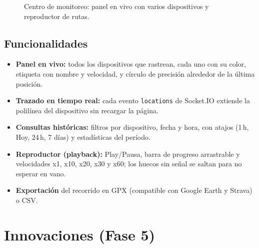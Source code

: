 \documentclass[11pt]{article}
\begin{document}
\begin{figure}[H]
{}
\caption{Centro de monitoreo: panel en vivo con varios dispositivos y reproductor de rutas.}
\end{figure}

\subsection{Funcionalidades}
\begin{itemize}
  \item \textbf{Panel en vivo:} todos los dispositivos que rastrean, cada uno con su color, etiqueta con nombre
        y velocidad, y círculo de precisión alrededor de la última posición.
  \item \textbf{Trazado en tiempo real:} cada evento \texttt{locations} de Socket.IO extiende la polilínea
        del dispositivo sin recargar la página.
  \item \textbf{Consultas históricas:} filtros por dispositivo, fecha y hora, con atajos (1\,h, Hoy, 24\,h,
        7 días) y estadísticas del período.
  \item \textbf{Reproductor (playback):} Play/Pausa, barra de progreso arrastrable y velocidades x1, x10,
        x20, x30 y x60; los huecos sin señal se saltan para no esperar en vano.
  \item \textbf{Exportación} del recorrido en GPX (compatible con Google Earth y Strava) o CSV.
\end{itemize}

\section{Innovaciones (Fase 5)}
\end{document}
